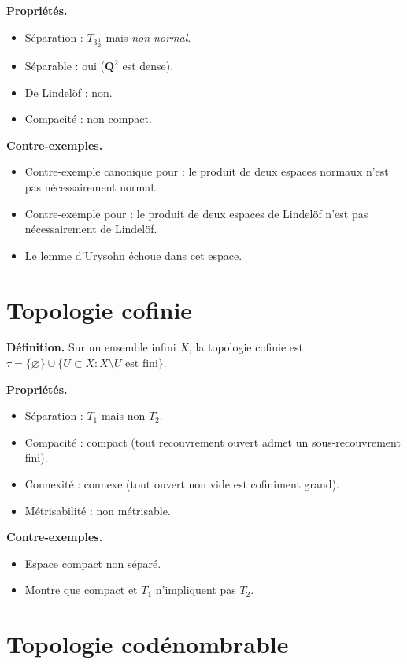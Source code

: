 \documentclass[12pt,a4paper,openany]{book}
\theoremstyle{definition}
\theoremstyle{cours}
\theoremstyle{coursnormal}
\begin{document}
\textbf{Propriétés.}
\begin{itemize}
  \item Séparation : $T_{3\frac{1}{2}}$ mais \emph{non normal}.
  \item Séparable : oui ($\mathbf{Q}^2$ est dense).
  \item De Lindelöf : non.
  \item Compacité : non compact.
\end{itemize}

\textbf{Contre-exemples.}
\begin{itemize}
  \item Contre-exemple canonique pour : le produit de deux espaces
    normaux n'est pas nécessairement normal.
  \item Contre-exemple pour : le produit de deux espaces de Lindelöf
    n'est pas nécessairement de Lindelöf.
  \item Le lemme d'Urysohn échoue dans cet espace.
\end{itemize}

\section{Topologie cofinie}
\label{app:cofinie}

\textbf{Définition.} Sur un ensemble infini $X$, la topologie cofinie
est $\tau=\{\varnothing\}\cup\{U\subset X: X\setminus U\text{ est fini}\}$.

\textbf{Propriétés.}
\begin{itemize}
  \item Séparation : $T_1$ mais non $T_2$.
  \item Compacité : compact (tout recouvrement ouvert admet un
    sous-recouvrement fini).
  \item Connexité : connexe (tout ouvert non vide est cofiniment grand).
  \item Métrisabilité : non métrisable.
\end{itemize}

\textbf{Contre-exemples.}
\begin{itemize}
  \item Espace compact non séparé.
  \item Montre que compact et $T_1$ n'impliquent pas $T_2$.
\end{itemize}

\section{Topologie codénombrable}
\label{app:codenombrable}
\end{document}
